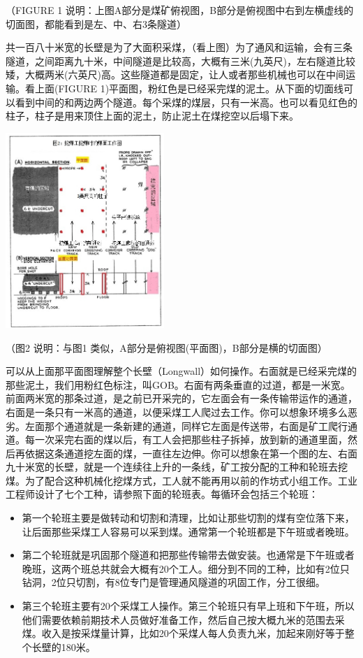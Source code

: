 （FIGURE 1
说明：上图A部分是煤矿俯视图，B部分是俯视图中右到左横虚线的切面图，都能看到是左、中、右3条隧道）

共一百八十米宽的长壁是为了大面积采煤，（看上图）为了通风和运输，会有三条隧道，之间距离九十米，中间隧道是比较高，大概有三米(九英尺)，左右隧道比较矮，大概两米(六英尺)高。这些隧道都是固定，让人或者那些机械也可以在中间运输。看上面(FIGURE
1)平面图，粉红色是已经采完煤的泥土。从下面的切面线可以看到中间的和两边两个隧道。每个采煤的煤层，只有一米高。也可以看见红色的柱子，柱子是用来顶住上面的泥土，防止泥土在煤挖空以后塌下来。


\includegraphics[width=6cm]{langwall2-修改52.jpg}

（图2 说明：与图1 类似，A部分是俯视图(平面图)，B部分是横的切面图）

可以从上面那平面图理解整个长壁（Longwall）如何操作。右面就是已经采完煤的那些泥土，我们用粉红色标注，叫GOB。右面有两条垂直的过道，都是一米宽。前面两米宽的那条过道，是之前已开采完的，它左面会有一条传输带运作的通道，右面是一条只有一米高的通道，以便采煤工人爬过去工作。你可以想象环境多么恶劣。左面那个通道就是一条新建的通道，同样它左面是传送带，右面是矿工爬行通道。每一次采完右面的煤以后，有工人会把那些柱子拆掉，放到新的通道里面，然后再依据这条通道挖左面的煤，一直往左边伸。你可以想象在第一个图的左、右面九十米宽的长壁，就是一个连续往上升的一条线，矿工按分配的工种和轮班去挖煤。为了配合这种机械化挖煤方式，工人就不能再用以前的作坊式小组工作。工业工程师设计了七个工种，请参照下面的轮班表。每循环会包括三个轮班：

\begin{itemize}
\tightlist
\item
  第一个轮班主要是做转动和切割和清理，比如让那些切割的煤有空位落下来，让后面那些采煤工人容易可以采到煤。通常第一个轮班都是下午班或者晚班。
\item
  第二个轮班就是巩固那个隧道和把那些传输带去做安装。也通常是下午班或者晚班，这两个班总共就会大概有20个工人。细分到不同的工种，比如有2位只钻洞，2位只切割，有8位专门是管理通风隧道的巩固工作，分工很细。
\item
  第三个轮班主要有20个采煤工人操作。第三个轮班只有早上班和下午班，所以他们需要依赖前期技术人员做好准备工作，然后自己按大概九米的范围去采煤。收入是按采煤量计算，比如20个采煤人每人负责九米，加起来刚好等于整个长壁的180米。
\end{itemize}

